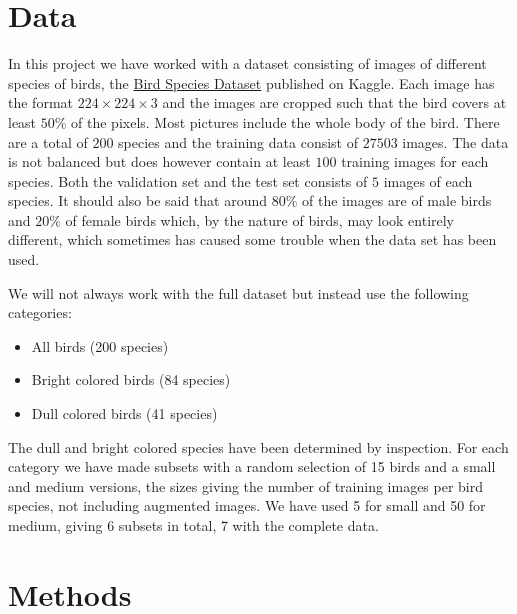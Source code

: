 \documentclass{article}
\begin{document}
\section{Data}

In this project we have worked with a dataset consisting of images of different species of birds, the  
\href{https://www.kaggle.com/gpiosenka/100-bird-species}{Bird Species Dataset} published on Kaggle. Each image has the format $224 \times 224 \times 3$ and the images are cropped such that the bird covers at least $50$\% of the pixels. Most pictures include the whole body of the bird.
There are 
a total of $200$ species and the training data consist of $27503$ images. The data is not balanced but does however contain at least $100$ training images for each species. 
Both the validation set and the test set consists of $5$ images of each species. 
It should also be said that around $80\%$ of the images are of male birds and $20\%$ of female 
birds which, by the nature of birds, may look entirely different, which sometimes has caused some trouble when the data set has been used.

We will not always work with the full dataset but instead use the following categories:

\begin{itemize}
	\item All birds (200 species)
	\item Bright colored birds (84 species)
	\item Dull colored birds (41 species)
\end{itemize}

The dull and bright colored species have been determined by inspection. For each category we have made subsets with a random selection of 15 birds and a small and medium versions, the sizes giving the number of training images per bird species, not including augmented images. We have used 5 for small and 50 for medium, giving 6 subsets in total, 7 with the complete data.


\section{Methods}

\end{document}
